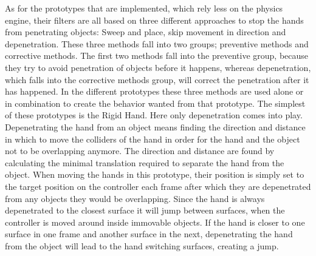As for the prototypes that are implemented, which rely less on the physics engine, their filters are all based on three different approaches to stop the hands from penetrating objects: Sweep and place, skip movement in direction and depenetration. These three methods fall into two groups; preventive methods and corrective methods. The first two methods fall into the preventive group, because they try to avoid penetration of objects before it happens, whereas depenetration, which falls into the corrective methods group, will correct the penetration after it has happened. In the different prototypes these three methods are used alone or in combination to create the behavior wanted from that prototype. The simplest of these prototypes is the Rigid Hand. Here only depenetration comes into play. Depenetrating the hand from an object means finding the direction and distance in which to move the colliders of the hand in order for the hand and the object not to be overlapping anymore. The direction and distance are found by calculating the minimal translation required to separate the hand from the object. When moving the hands in this prototype, their position is simply set to the target position on the controller each frame after which they are depenetrated from any objects they would be overlapping. Since the hand is always depenetrated to the closest surface it will jump between surfaces, when the controller is moved around inside immovable objects. If the hand is closer to one surface in one frame and another surface in the next, depenetrating the hand from the object will lead to the hand switching surfaces, creating a jump.


